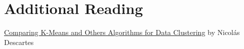 \documentclass[12pt,a4paper]{scrartcl}
\begin{document}
\section{Additional Reading}

	\href{https://www.codeproject.com/Articles/5375470/Comparing-K-Means-and-Others-Algorithms-for-Data-C}{Comparing K-Means and Others Algorithms for Data Clustering} by Nicolás Descartes 

\thispagestyle{empty}
\end{document}
